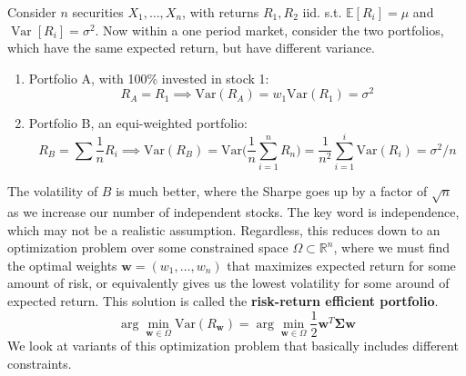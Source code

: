 \documentclass{article}
\DeclareMathOperator{\Var}{Var}
\begin{document}
    Consider $n$ securities $X_1, \ldots, X_n$, with returns $R_1, R_2$ iid. s.t. $\mathbb{E}[R_i] = \mu$ and $\Var[R_i] = \sigma^2$. Now within a one period market, consider the two portfolios, which have the same expected return, but have different variance.  
    \begin{enumerate}
      \item Portfolio A, with 100\% invested in stock 1: 
        \begin{equation}
          R_A = R_1 \implies \mathrm{Var}(R_A) = w_1 \mathrm{Var}(R_1) = \sigma^2 
        \end{equation}
      \item Portfolio B, an equi-weighted portfolio: 
        \begin{equation}
          R_B = \sum \frac{1}{n} R_i \implies \mathrm{Var}(R_B) = \mathrm{Var} \bigg( \frac{1}{n} \sum_{i=1}^n R_n \bigg) = \frac{1}{n^2} \sum_{i=1}^i \mathrm{Var}(R_i) = \sigma^2 / n
        \end{equation}
    \end{enumerate}
    The volatility of $B$ is much better, where the Sharpe goes up by a factor of $\sqrt{n}$ as we increase our number of independent stocks. The key word is independence, which may not be a realistic assumption. Regardless, this reduces down to an optimization problem over some constrained space $\Omega \subset \mathbb{R}^n$, where we must find the optimal weights $\mathbf{w} = (w_1, \ldots, w_n)$ that maximizes expected return for some amount of risk, or equivalently gives us the lowest volatility for some around of expected return. This solution is called the \textbf{risk-return efficient portfolio}. 
    \begin{equation}
      \arg \min_{\mathbf{w} \in \Omega} \mathrm{Var}(R_{\mathbf{w}}) = \arg \min_{\mathbf{w} \in \Omega} \frac{1}{2} \mathbf{w}^T \boldsymbol{\Sigma} \mathbf{w}
    \end{equation}
    We look at variants of this optimization problem that basically includes different constraints. 
\end{document}
